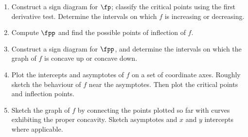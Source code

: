 {%
\begin{enumerate}\addtocounter{enumi}{5}
\item 		Construct a sign diagram for $\fp$; classify the critical points using the first derivative test. Determine the intervals on which $f$ is increasing or decreasing.
\item		Compute $\fpp$ and find the possible points of inflection of $f$. 
\item		Construct a sign diagram for $\fpp$, and determine the intervals on which the graph of $f$ is concave up or concave down.
\item 		Plot the intercepts and asymptotes of $f$ on a set of coordinate axes. Roughly sketch the behaviour of $f$ near the asymptotes.
Then plot the critical points and inflection points.
\item		Sketch the graph of $f$ by connecting the points plotted so far with curves exhibiting the proper concavity. Sketch asymptotes and $x$ and $y$ intercepts where applicable.
\end{enumerate}
}

